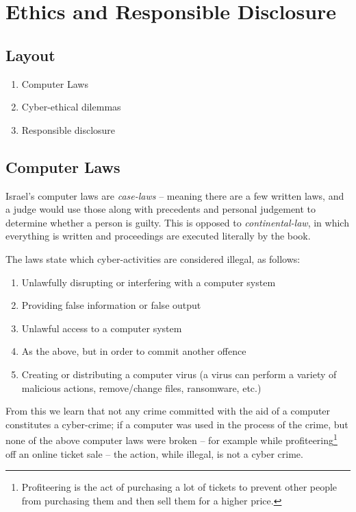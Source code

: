 \chapter{Ethics and Responsible Disclosure}\label{ethics_chapter}

\section*{Layout}
\begin{enumerate}
    \item Computer Laws
    \item Cyber-ethical dilemmas
    \item Responsible disclosure
\end{enumerate}

\section{Computer Laws}\label{sec:comp_laws}
Israel’s computer laws are \textit{case-laws} – meaning there are a few written laws, and a judge would use those along with precedents and personal judgement to determine whether a person is guilty. This is opposed to \textit{continental-law}, in which everything is written and proceedings are executed literally by the book.


The laws state which cyber-activities are considered illegal, as follows:
\begin{enumerate}
    \item Unlawfully disrupting or interfering with a computer system
    \item Providing false information or false output
    \item Unlawful access to a computer system
    \item As the above, but in order to commit another offence
    \item Creating or distributing a computer virus (a virus can perform a variety of malicious actions, remove/change files, ransomware, etc.)
\end{enumerate}
From this we learn that not any crime committed with the aid of a computer constitutes a cyber-crime; if a computer was used in the process of the crime, but none of the above computer laws were broken -- for example while profiteering\footnote{Profiteering is the act of purchasing a lot of tickets to prevent other people from purchasing them and then sell them for a higher price.} off an online ticket sale -- the action, while illegal, is not a cyber crime.


